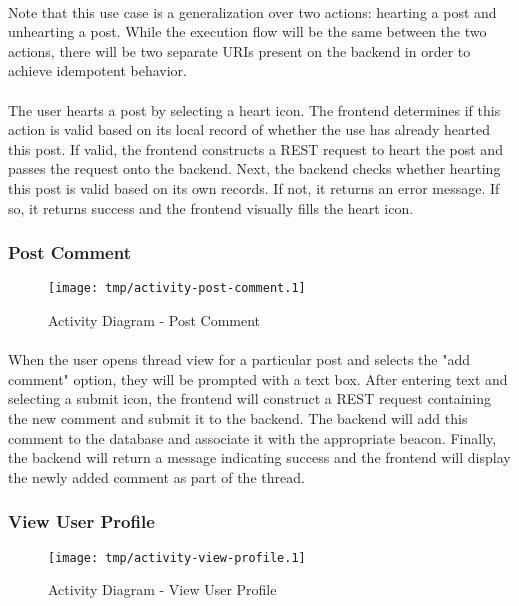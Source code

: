         \paragraph*{}
        Note that this use case is a generalization over two actions: hearting a post
        and unhearting a post. While the execution flow will be the same between the two
        actions, there will be two separate URIs present on the backend in order to
        achieve idempotent behavior.

        \paragraph*{}
        The user hearts a post by selecting a heart icon. The frontend determines if
        this action is valid based on its local record of whether the use has already
        hearted this post. If valid, the frontend constructs a REST request to heart
        the post and passes the request onto the backend. Next, the backend checks
        whether hearting this post is valid based on its own records. If not, it
        returns an error message. If so, it returns success and the frontend visually
        fills the heart icon.

        \subsubsection{Post Comment}
        \begin{figure}[H]
            \centering
            \texttt{[image: tmp/activity-post-comment.1]} 
            \caption{Activity Diagram - Post Comment}
        \end{figure}

        \paragraph*{}
        When the user opens thread view for a particular post and selects the "add
        comment" option, they will be prompted with a text box. After entering text
        and selecting a submit icon, the frontend will construct a REST request
        containing the new comment and submit it to the backend. The backend will add
        this comment to the database and associate it with the appropriate beacon.
        Finally, the backend will return a message indicating success and the frontend
        will display the newly added comment as part of the thread.

        \subsubsection{View User Profile}
        \begin{figure}[H]
            \centering
            \texttt{[image: tmp/activity-view-profile.1]} 
            \caption{Activity Diagram - View User Profile}
        \end{figure}

